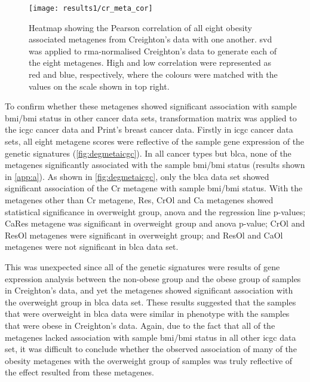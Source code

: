 \begin{figure}[htpb]
	\centering
	\texttt{[image: results1/cr\_meta\_cor]}
	\caption[Pearson correlation of all eight obesity associated metagenes identified in Creighton's data]{Heatmap showing the Pearson correlation of all eight obesity associated metagenes from Creighton's data with one another.
	\gls{svd} was applied to \gls{rma}-normalised Creighton's data to generate each of the eight metagenes.
	High and low correlation were represented as red and blue, respectively, where the colours were matched with the values on the scale shown in top right.}
	\label{fig:cr_meta_cor}
\end{figure}

To confirm whether these metagenes showed significant association with sample \gls{bmi}/\gls{bmi} status in other cancer data sets, transformation matrix was applied to the \gls{icgc} cancer data and Print's breast cancer data.
Firstly in \gls{icgc} cancer data sets, all eight metagene scores were reflective of the sample gene expression of the genetic signatures (\cref{fig:degmetaicgc}).
In all cancer types but \gls{blca}, none of the metagenes significantly associated with the sample \gls{bmi}/\gls{bmi} status (results shown in \cref{app:a}).
As shown in \cref{fig:degmetaicgc}, only the \gls{blca} data set showed significant association of the Cr metagene with sample \gls{bmi}/\gls{bmi} status.
With the metagenes other than Cr metagene, Res, CrOl and Ca metagenes showed statistical significance in overweight group, \gls{anova} and the regression line p-values; CaRes metagene was significant in overweight group and \gls{anova} p-value; CrOl and ResOl metagenes were significant in overweight group; and ResOl and CaOl metagenes were not significant in \gls{blca} data set.

This was unexpected since all of the genetic signatures were results of gene expression analysis between the non-obese group and the obese group of samples in Creighton's data, and yet the metagenes showed significant association with the overweight group in \gls{blca} data set.
These results suggested that the samples that were overweight in \gls{blca} data were similar in phenotype with the samples that were obese in Creighton's data.
Again, due to the fact that all of the metagenes lacked association with sample \gls{bmi}/\gls{bmi} status in all other \gls{icgc} data set, it was difficult to conclude whether the observed association of many of the obesity metagenes with the overweight group of samples was truly reflective of the effect resulted from these metagenes.

